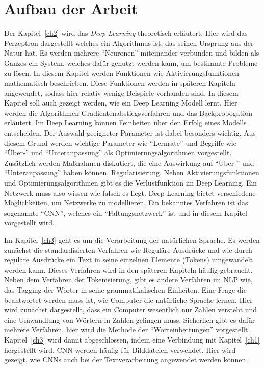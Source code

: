 \section{Aufbau der Arbeit}
Der Kapitel~\ref{ch2} wird das \textit{Deep Learning} theoretisch erläutert. Hier wird das Perzeptron dargestellt welches ein Algorithmus ist, das seinen Ursprung aus der Natur hat. Es werden mehrere \enquote{Neuronen} miteinander verbunden und bilden als Ganzes ein System, welches dafür genutzt werden kann, um bestimmte Probleme zu lösen. In diesem Kapitel werden Funktionen wie Aktivierungsfunktionen mathematisch beschrieben. Diese Funktionen werden in späteren Kapiteln angewendet, sodass hier relativ wenige Beispiele vorhanden sind. In diesem Kapitel soll auch gezeigt werden, wie ein Deep Learning Modell lernt. Hier werden die Algorithmen Gradientenabstiegsverfahren und das Backpropogation erläutert. Im Deep Learning können Feinheiten über den Erfolg eines Modells entscheiden. Der Auswahl geeigneter Parameter ist dabei besonders wichtig. Aus diesem Grund werden wichtige Parameter wie \enquote{Lernrate} und Begriffe wie \enquote{Über-} und \enquote{Unteranpassung} als Optimierungsalgorithmen vorgestellt. Zusätzlich werden Maßnahmen diskutiert, die eine Auswirkung auf \enquote{Über-} und \enquote{Unteranpassung} haben können, Regularisierung. Neben Aktivierungsfunktionen und Optimierungsalgorithmen gibt es die Verlustfunktion im Deep Learning. Ein Netzwerk muss also wissen wie falsch es liegt. Deep Learning bietet verschiedene Möglichkeiten, um Netzwerke zu modellieren. Ein bekanntes Verfahren ist das sogenannte \enquote{CNN}, welches ein \enquote{Faltungsnetzwerk} ist und in diesem Kapitel vorgestellt wird.

Im Kapitel~\ref{ch3} geht es um die Verarbeitung der natürlichen Sprache. Es werden zunächst die standardisierten Verfahren wie Reguläre Ausdrücke und wie durch reguläre Ausdrücke ein Text in seine einzelnen Elemente (Tokens) umgewandelt werden kann. Dieses Verfahren wird in den späteren Kapiteln häufig gebraucht. Neben dem Verfahren der Tokenisierung, gibt es andere Verfahren im NLP wie, das Tagging der Wörter in seine grammatikalischen Einheiten. Eine Frage die beantwortet werden muss ist, wie Computer die natürliche Sprache lernen. Hier wird zunächst dargestellt, dass ein Computer wesentlich nur Zahlen versteht und eine Umwandlung von Wörtern in Zahlen gelingen muss. Sicherlich gibt es dafür mehrere Verfahren, hier wird die Methode der \enquote{Worteinbettungen} vorgestellt. Kapitel~\ref{ch3} wird damit abgeschlossen, indem eine Verbindung mit Kapitel~\ref{ch1} hergestellt wird. CNN werden häufig für Bilddateien verwendet. Hier wird gezeigt, wie CNNs auch bei der Textverarbeitung angewendet werden können.

